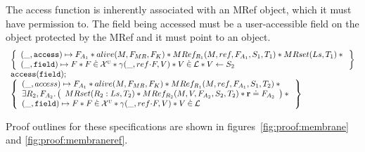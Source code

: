 \documentclass[a4paper,notitlepage]{report}
\begin{document}
The access function is inherently associated with an MRef object, which it must
have permission to. The field being accessed must be a user-accessible field on
the object protected by the MRef and it must point to an object.
\[
  \begin{array}{l}
    \logic{
      (\_,\js{access}) \pointsto F_{A_1} \sep
      alive(M, F_{MR}, F_K) \sep
      MRef_{R_1}(M,ref,F_{A_1},S_1,T_1) \sep
      MRset(Ls,T_1) \sep {} \\

      (\_, \js{field}) \pointsto F \sep F \dotin \uvars \sep
      \getValue(\_, \fld{ref}{F}, V) \sep
      V \dotin \loc \sep
      V \bp S_2
    } \\
    \js{access(field);} \\
    \logic{
      (\_, access) \pointsto F_{A_1} \sep
      alive(M, F_{MR}, F_K) \sep
      MRef_{R_1}(M,ref,F_{A_1},S_1,T_2) \sep {} \\
      \exists R_2, F_{A_2} \st \args{
        MRset(R_2:Ls,T_2) \sep
        MRef_{R_2}(M,V,F_{A_2},S_2,T_2) \sep
        \rv \doteq F_{A_2}
      } \sep {} \\
      (\_, \js{field}) \pointsto F \sep F \dotin \uvars \sep
      \getValue(\_, \fld{ref}{F}, V) \sep
      V \dotin \loc
    }
  \end{array}
\]

Proof outlines for these specifications are shown in
figures~\ref{fig:proof:membrane} and \ref{fig:proof:membraneref}.
\end{document}
